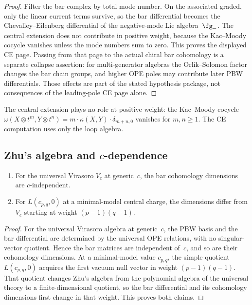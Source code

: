 \begin{proof}
Filter the bar complex by total mode number. On the associated graded,
only the linear current terms survive, so the bar differential becomes
the Chevalley--Eilenberg differential of the negative-mode Lie
algebra~$\fg_-$. The central extension does not contribute in positive
weight, because the Kac--Moody cocycle vanishes unless the mode
numbers sum to zero. This proves the displayed CE page. Passing from
that page to the actual chiral bar cohomology is a separate collapse
assertion: for multi-generator algebras the Orlik--Solomon factor
changes the bar chain groups, and higher OPE poles may contribute
later PBW differentials. Those effects are part of the stated
hypothesis package, not consequences of the leading-pole CE page alone.
\end{proof}

The central extension plays no role at positive weight: the
Kac--Moody cocycle $\omega(X \otimes t^m, Y \otimes t^n) =
m \cdot \kappa(X,Y) \cdot \delta_{m+n,0}$ vanishes for
$m, n \geq 1$. The CE computation uses only the loop algebra.


\subsection{Zhu's algebra and $c$-dependence}
\label{subsec:comp-zhu}

\begin{theorem}
\label{thm:comp-zhu-c-dependence}
\ClaimStatusProvedHere
\begin{enumerate}[label=\textup{(\roman*)}]
\item For the universal Virasoro $V_c$ at generic~$c$, the bar
 cohomology dimensions are $c$-independent.
\item For $L(c_{p,q}, 0)$ at a minimal-model central charge,
 the dimensions differ from $V_c$ starting at weight
 $(p-1)(q-1)$.
\end{enumerate}
\end{theorem}

\begin{proof}
For the universal Virasoro algebra at generic~$c$, the PBW basis and
the bar differential are determined by the universal OPE relations,
with no singular-vector quotient. Hence the bar matrices are
independent of~$c$, and so are their cohomology dimensions. At a
minimal-model value $c_{p,q}$, the simple quotient
$L(c_{p,q},0)$ acquires the first vacuum null vector in weight
$(p-1)(q-1)$. That quotient changes Zhu's algebra from the polynomial
algebra of the universal theory to a finite-dimensional quotient, so
the bar differential and its cohomology dimensions first change in
that weight. This proves both claims.
\end{proof}

